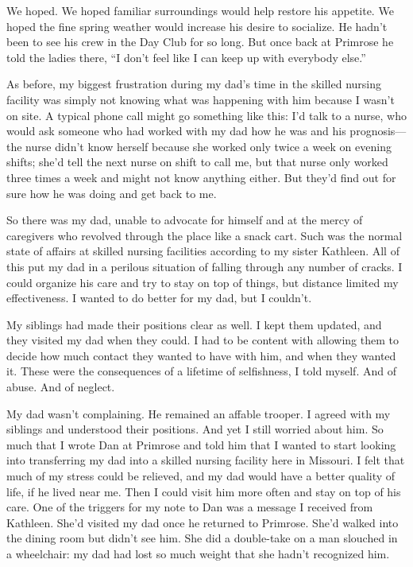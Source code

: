 \documentclass[12pt]{book}
\begin{document}
We hoped. We hoped familiar surroundings would help restore his appetite. We hoped the fine spring weather would increase his desire to socialize. He hadn't been to see his crew in the Day Club for so long. But once back at Primrose he told the ladies there, ``I don't feel like I can keep up with everybody else.''

As before, my biggest frustration during my dad's time in the skilled nursing facility was simply not knowing what was happening with him because I wasn't on site. A typical phone call might go something like this: I'd talk to a nurse, who would ask someone who had worked with my dad how he was and his prognosis---the nurse didn't know herself because she worked only twice a week on evening shifts; she'd tell the next nurse on shift to call me, but that nurse only worked three times a week and might not know anything either. But they'd find out for sure how he was doing and get back to me.

So there was my dad, unable to advocate for himself and at the mercy of caregivers who revolved through the place like a snack cart. Such was the normal state of affairs at skilled nursing facilities according to my sister Kathleen. All of this put my dad in a perilous situation of falling through any number of cracks. I could organize his care and try to stay on top of things, but distance limited my effectiveness. I wanted to do better for my dad, but I couldn't.

My siblings had made their positions clear as well. I kept them updated, and they visited my dad when they could. I had to be content with allowing them to decide how much contact they wanted to have with him, and when they wanted it. These were the consequences of a lifetime of selfishness, I told myself. And of abuse. And of neglect.

My dad wasn't complaining. He remained an affable trooper. I agreed with my siblings and understood their positions. And yet I still worried about him. So much that I wrote Dan at Primrose and told him that I wanted to start looking into transferring my dad into a skilled nursing facility here in Missouri. I felt that much of my stress could be relieved, and my dad would have a better quality of life, if he lived near me. Then I could visit him more often and stay on top of his care. One of the triggers for my note to Dan was a message I received from Kathleen. She'd visited my dad once he returned to Primrose. She'd walked into the dining room but didn't see him. She did a double-take on a man slouched in a wheelchair: my dad had lost so much weight that she hadn't recognized him.
\end{document}
